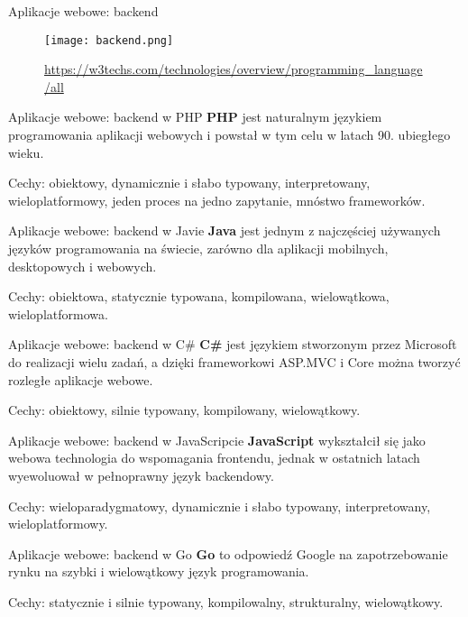 \begin{frame}{Aplikacje webowe: backend}		
	\begin{figure}
		\centering
		\texttt{[image: backend.png]}
		\caption{\url{https://w3techs.com/technologies/overview/programming_language/all}}
	\end{figure}
\end{frame}

\begin{frame}{Aplikacje webowe: backend w PHP}		
	\textbf{PHP} jest naturalnym językiem programowania aplikacji webowych i powstał w tym celu w latach 90. ubiegłego wieku. 
	
	Cechy: obiektowy, dynamicznie i słabo typowany, interpretowany, wieloplatformowy, jeden proces na jedno zapytanie, mnóstwo frameworków.
\end{frame}

\begin{frame}{Aplikacje webowe: backend w Javie}		
	\textbf{Java} jest jednym z najczęściej używanych języków programowania na świecie, zarówno dla aplikacji mobilnych, desktopowych i webowych.
	
	Cechy: obiektowa, statycznie typowana, kompilowana, wielowątkowa, wieloplatformowa.
\end{frame}

\begin{frame}{Aplikacje webowe: backend w C\#}		
	\textbf{C\#} jest językiem stworzonym przez Microsoft do realizacji wielu zadań, a dzięki frameworkowi ASP.MVC i Core można tworzyć rozległe aplikacje webowe.
	
	Cechy: obiektowy, silnie typowany, kompilowany, wielowątkowy.
\end{frame}

\begin{frame}{Aplikacje webowe: backend w JavaScripcie}		
	\textbf{JavaScript} wykształcił się jako webowa technologia do wspomagania frontendu, jednak w ostatnich latach wyewoluował w pełnoprawny język backendowy.
	
	Cechy: wieloparadygmatowy, dynamicznie i słabo typowany, interpretowany, wieloplatformowy.
\end{frame}

\begin{frame}{Aplikacje webowe: backend w Go}		
	\textbf{Go} to odpowiedź Google na zapotrzebowanie rynku na szybki i wielowątkowy język programowania. 
	
	Cechy: statycznie i silnie typowany, kompilowalny, strukturalny, wielowątkowy.
\end{frame}

